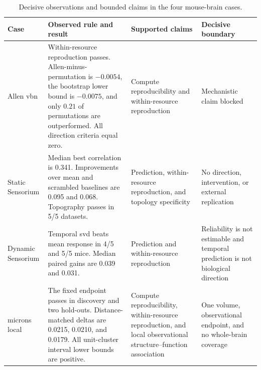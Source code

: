 \begin{table}[t!]
\centering
\caption{Decisive observations and bounded claims in the four mouse-brain cases.}
\label{tab:real-case-summary}
\footnotesize
\renewcommand{\arraystretch}{1.02}
\begin{tabularx}{\textwidth}{@{}p{}p{}p{}Y@{}}
\toprule
Case & Observed rule and result & Supported claims & Decisive boundary \\
\midrule
Allen \acs{vbn} & Within-resource reproduction passes. Allen-minus-permutation is $-0.0054$, the bootstrap lower bound is $-0.0075$, and only $0.21$ of permutations are outperformed. All direction criteria equal zero. & Compute reproducibility and within-resource reproduction & Mechanistic claim blocked \\
\addlinespace[2pt]
Static Sensorium & Median best correlation is 0.341. Improvements over mean and scrambled baselines are 0.095 and 0.068. Topography passes in 5/5 datasets. & Prediction, within-resource reproduction, and topology specificity & No direction, intervention, or external replication \\
\addlinespace[2pt]
Dynamic Sensorium & Temporal \acs{svd} beats mean response in 4/5 and 5/5 mice. Median paired gains are 0.039 and 0.031. & Prediction and within-resource reproduction & Reliability is not estimable and temporal prediction is not biological direction \\
\addlinespace[2pt]
\acs{microns} local & The fixed endpoint passes in discovery and two hold-outs. Distance-matched deltas are 0.0215, 0.0210, and 0.0179. All unit-cluster interval lower bounds are positive. & Compute reproducibility, within-resource reproduction, and local observational structure--function association & One volume, observational endpoint, and no whole-brain coverage \\
\bottomrule
\end{tabularx}
\end{table}
